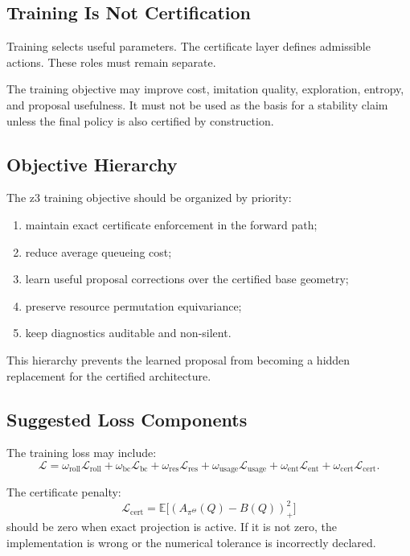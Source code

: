 \documentclass[a4paper,11pt]{article}
\theoremstyle{definition}
\begin{document}
\subsection{Training Is Not Certification}

Training selects useful parameters. The certificate layer defines admissible
actions. These roles must remain separate.

The training objective may improve cost, imitation quality, exploration,
entropy, and proposal usefulness. It must not be used as the basis for a
stability claim unless the final policy is also certified by construction.

\subsection{Objective Hierarchy}

The z3 training objective should be organized by priority:
\begin{enumerate}
  \item maintain exact certificate enforcement in the forward path;
  \item reduce average queueing cost;
  \item learn useful proposal corrections over the certified base geometry;
  \item preserve resource permutation equivariance;
  \item keep diagnostics auditable and non-silent.
\end{enumerate}
This hierarchy prevents the learned proposal from becoming a hidden replacement
for the certified architecture.

\subsection{Suggested Loss Components}

The training loss may include:
\[
\mathcal L
=
\omega_{\mathrm{roll}}\mathcal L_{\mathrm{roll}}
+
\omega_{\mathrm{bc}}\mathcal L_{\mathrm{bc}}
+
\omega_{\mathrm{res}}\mathcal L_{\mathrm{res}}
+
\omega_{\mathrm{usage}}\mathcal L_{\mathrm{usage}}
+
\omega_{\mathrm{ent}}\mathcal L_{\mathrm{ent}}
+
\omega_{\mathrm{cert}}\mathcal L_{\mathrm{cert}}.
\]

The certificate penalty:
\[
\mathcal L_{\mathrm{cert}}
=
\mathbb E\bigl[(A_{\pi^\Theta}(Q)-B(Q))_+^2\bigr]
\]
should be zero when exact projection is active. If it is not zero, the
implementation is wrong or the numerical tolerance is incorrectly declared.
\end{document}
